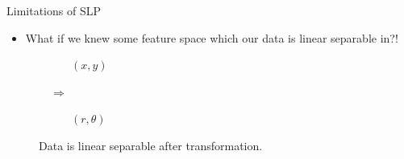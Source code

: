 \begin{frame}{Limitations of SLP}
    \begin{itemize}
        \item What if we knew some feature space which our data is linear separable in?!
    \end{itemize}
    \begin{figure}[H]
        \centering
        \begin{subfigure}[b]{0.35\textwidth}
            \centering
            $(x, y)$
        \end{subfigure}
        $\quad\Longrightarrow\quad$
        \begin{subfigure}[b]{0.35\textwidth}
            \centering
            $(r, \theta)$
        \end{subfigure}
        \caption{Data is linear separable after transformation.}
    \end{figure}
\end{frame}

